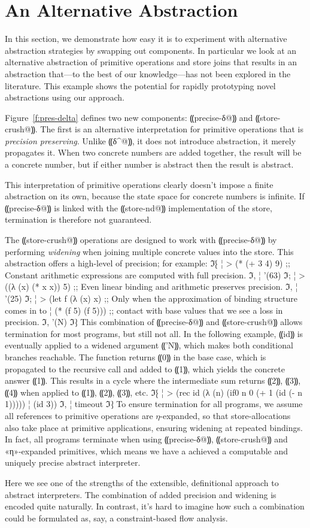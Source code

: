 \section{An Alternative Abstraction}\label{s:alt-abstraction}

In this section, we demonstrate how easy it is to experiment with
alternative abstraction strategies by swapping out components.  In
particular we look at an alternative abstraction of primitive
operations and store joins that results in an abstraction that---to
the best of our knowledge---has not been explored in the literature.
This example shows the potential for rapidly prototyping novel
abstractions using our approach.

Figure~\ref{f:pres-delta} defines two new components: ⸨precise-δ@⸩ and
⸨store-crush@⸩.  The first is an alternative interpretation for primitive
operations that is \emph{precision preserving}.  Unlike ⸨δ^@⸩, it does not
introduce abstraction, it merely propagates it.  When two concrete
numbers are added together, the result will be a concrete number, but if either
number is abstract then the result is abstract.

This interpretation of primitive operations clearly doesn't impose a finite
abstraction on its own, because the state space for concrete numbers is
infinite. If ⸨precise-δ@⸩ is linked with the ⸨store-nd@⸩ implementation of the
store, termination is therefore not guaranteed.  

The ⸨store-crush@⸩ operations are designed to work with ⸨precise-δ@⸩ by
performing \emph{widening} when joining multiple concrete values into the
store. This abstraction offers a high-level of precision; for example:
ℑ⁅
¦ > (* (+ 3 4) 9)        ;; Constant arithmetic expressions are computed with full precision.
ℑ,
¦ '(63)
ℑ;
¦ > ((λ (x) (* x x)) 5)  ;; Even linear binding and arithmetic preserves precision.
ℑ,
¦ '(25)
ℑ;
¦ > (let f (λ (x) x)     ;; Only when the approximation of binding structure comes in to
¦     (* (f 5) (f 5)))   ;; contact with base values that we see a loss in precision.
ℑ,
'(N)
ℑ⁆
This combination of ⸨precise-δ@⸩ and ⸨store-crush@⸩ allows termination for most
programs, but still not all. In the following example, ⸨id⸩ is eventually
applied to a widened argument ⸨'N⸩, which makes both conditional branches
reachable. The function returns ⸨0⸩ in the base case, which is propagated to
the recursive call and added to ⸨1⸩, which yields the concrete answer ⸨1⸩.
This results in a cycle where the intermediate sum returns ⸨2⸩, ⸨3⸩, ⸨4⸩ when
applied to ⸨1⸩, ⸨2⸩, ⸨3⸩, etc.
ℑ⁅
¦ > (rec id (λ (n) (if0 n 0 (+ 1 (id (- n 1)))))
¦     (id 3))
ℑ,
¦ timeout
ℑ⁆
To ensure termination for all programs, we assume all references to
primitive operations are $η$-expanded, so that store-allocations also
take place at primitive applications, ensuring widening at repeated
bindings. In fact, all programs terminate when using ⸨precise-δ@⸩,
⸨store-crush@⸩ and «η»-expanded primitives, which means we have a
achieved a computable and uniquely precise abstract interpreter.

Here we see one of the strengths of the extensible, definitional approach to
abstract interpreters. The combination of added precision and widening is
encoded quite naturally. In contrast, it's hard to imagine how such a
combination could be formulated as, say, a constraint-based flow analysis.
